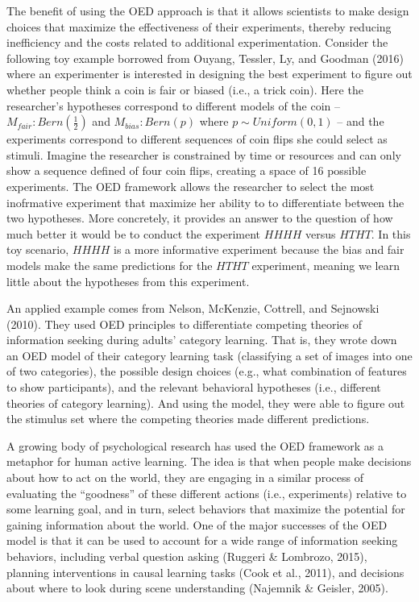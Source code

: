 \documentclass[english,floatsintext,man]{apa6}
\theoremstyle{definition}
\theoremstyle{definition}
\theoremstyle{definition}
\theoremstyle{remark}
\begin{document}
The benefit of using the OED approach is that it allows scientists to
make design choices that maximize the effectiveness of their
experiments, thereby reducing inefficiency and the costs related to
additional experimentation. Consider the following toy example borrowed
from Ouyang, Tessler, Ly, and Goodman (2016) where an experimenter is
interested in designing the best experiment to figure out whether people
think a coin is fair or biased (i.e., a trick coin). Here the
researcher's hypotheses correspond to different models of the coin --
\(M_{fair}: Bern(\frac{1}{2})\) and \(M_{bias}: Bern(p)\) where
\(p \sim Uniform(0,1)\) -- and the experiments correspond to different
sequences of coin flips she could select as stimuli. Imagine the
researcher is constrained by time or resources and can only show a
sequence defined of four coin flips, creating a space of 16 possible
experiments. The OED framework allows the researcher to select the most
inofrmative experiment that maximize her ability to to differentiate
between the two hypotheses. More concretely, it provides an answer to
the question of how much better it would be to conduct the experiment
\(HHHH\) versus \(HTHT\). In this toy scenario, \(HHHH\) is a more
informative experiment because the bias and fair models make the same
predictions for the \(HTHT\) experiment, meaning we learn little about
the hypotheses from this experiment.

An applied example comes from Nelson, McKenzie, Cottrell, and Sejnowski
(2010). They used OED principles to differentiate competing theories of
information seeking during adults' category learning. That is, they
wrote down an OED model of their category learning task (classifying a
set of images into one of two categories), the possible design choices
(e.g., what combination of features to show participants), and the
relevant behavioral hypotheses (i.e., different theories of category
learning). And using the model, they were able to figure out the
stimulus set where the competing theories made different predictions.

A growing body of psychological research has used the OED framework as a
metaphor for human active learning. The idea is that when people make
decisions about how to act on the world, they are engaging in a similar
process of evaluating the \enquote{goodness} of these different actions
(i.e., experiments) relative to some learning goal, and in turn, select
behaviors that maximize the potential for gaining information about the
world. One of the major successes of the OED model is that it can be
used to account for a wide range of information seeking behaviors,
including verbal question asking (Ruggeri \& Lombrozo, 2015), planning
interventions in causal learning tasks (Cook et al., 2011), and
decisions about where to look during scene understanding (Najemnik \&
Geisler, 2005).
\end{document}
